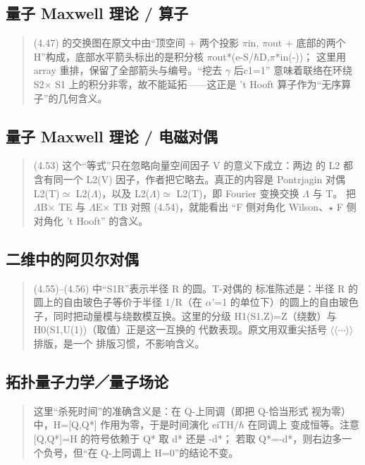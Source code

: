 \subsection*{量子 Maxwell 理论 / 算子}
\begin{quote}\small
(4.47) 的交换图在原文中由“顶空间 + 两个投影 $\pi$in, $\pi$out + 底部的两个 H”构成，底部水平箭头标出的是积分核 $\pi$out*(e-S/$\hbar$D,$\pi$*in(-))； 这里用 array 重排，保留了全部箭头与编号。“挖去 $\gamma$ 后c1=1” 意味着联络在环绕 S2$\times$ S1 上的积分非零，故不能延拓——这正是 't Hooft 算子作为“无序算子”的几何含义。
\end{quote}

\subsection*{量子 Maxwell 理论 / 电磁对偶}
\begin{quote}\small
(4.53) 这个“等式”只在忽略向量空间因子 V 的意义下成立：两边 的 L2 都含有同一个 L2(V) 因子，作者把它略去。真正的内容是 Pontrjagin 对偶 L2(T)$\simeq$ L2($\Lambda$)，以及 L2($\Lambda$)$\simeq$ L2(T)，即 Fourier 变换交换 $\Lambda$ 与 T。 把 $\Lambda$B$\times$ TE 与 $\Lambda$E$\times$ TB 对照 (4.54)，就能看出 “F 侧对角化 Wilson、$\star$ F 侧对角化 't Hooft” 的含义。
\end{quote}

\subsection*{二维中的阿贝尔对偶}
\begin{quote}\small
(4.55)--(4.56) 中“S1R”表示半径 R 的圆。T-对偶的 标准陈述是：半径 R 的圆上的自由玻色子等价于半径 1/R（在 $\alpha$'=1 的单位下）的圆上的自由玻色子，同时把动量模与绕数模互换。这里的分级 H1(S1,Z)=Z（绕数）与 H0(S1,U(1))（取值）正是这一互换的 代数表现。原文用双重尖括号 $\langle$$\langle$$\cdots$$\rangle$$\rangle$ 排版，是一个 排版习惯，不影响含义。
\end{quote}

\subsection*{拓扑量子力学／量子场论}
\begin{quote}\small
这里“杀死时间”的准确含义是：在 Q-上同调（即把 Q-恰当形式 视为零）中，H=[Q,Q*] 作用为零，于是时间演化 eiTH/$\hbar$ 在同调上 变成恒等。注意 [Q,Q*]=H 的符号依赖于 Q* 取 d* 还是 -d*； 若取 Q*=-d*，则右边多一个负号，但“在 Q-上同调上 H=0”的结论不变。
\end{quote}

